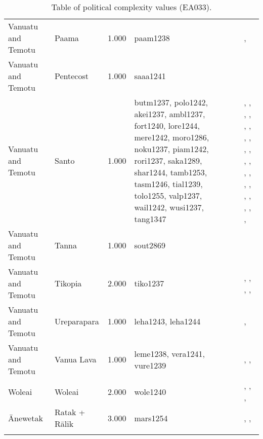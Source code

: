 \begin{longtable}{p{1.8cm}p{1.8cm}p{1.8cm}p{2cm}p{7cm}}
  Vanuatu and Temotu & Paama & 1.000 & paam1238 & \citet{bonnemaison1996power}, \citet{bonnemaison1996power} \\ 
  Vanuatu and Temotu & Pentecost & 1.000 & saaa1241 & \citet{lane1956} \\ 
  Vanuatu and Temotu & Santo & 1.000 & butm1237, polo1242, akei1237, ambl1237, fort1240, lore1244, mere1242, moro1286, noku1237, piam1242, rori1237, saka1289, shar1244, tamb1253, tasm1246, tial1239, tolo1255, valp1237, wail1242, wusi1237, tang1347 & \citet{bonnemaison1996power}, \citet{bonnemaison1996power}, \citet{bonnemaison1996power}, \citet{bonnemaison1996power}, \citet{bonnemaison1996power}, \citet{bonnemaison1996power}, \citet{bonnemaison1996power}, \citet{bonnemaison1996power}, \citet{bonnemaison1996power}, \citet{bonnemaison1996power}, \citet{bonnemaison1996power}, \citet{bonnemaison1996power}, \citet{bonnemaison1996power}, \citet{bonnemaison1996power}, \citet{bonnemaison1996power}, \citet{bonnemaison1996power}, \citet{bonnemaison1996power}, \citet{bonnemaison1996power}, \citet{bonnemaison1996power}, \citet{bonnemaison1996power}, \citet{bonnemaison1996power}, \citet{bonnemaison1996power} \\ 
  Vanuatu and Temotu & Tanna & 1.000 & sout2869 & \citet{lindstroem1991} \\ 
  Vanuatu and Temotu & Tikopia & 2.000 & tiko1237 & \citet{kirch1994wet}, \citet{sahlins1958social}, \citet{firth1939primitive}, \citet{firth1959social}, \citet{firth1991} \\ 
  Vanuatu and Temotu & Ureparapara & 1.000 & leha1243, leha1244 & \citet{bonnemaison1996power}, \citet{bonnemaison1996power} \\ 
  Vanuatu and Temotu & Vanua Lava & 1.000 & leme1238, vera1241, vure1239 & \citet{bonnemaison1996power}, \citet{bonnemaison1996power}, \citet{bonnemaison1996power} \\ 
  Woleai & Woleai & 2.000 & wole1240 & \citet{alkire1991woleai}, \citet{alkire1991woleai}, \citet{burrowsandspiro1953}, \citet{burrowsandspiro1953} \\ 
  Ānewetak & Ratak + Rālik & 3.000 & mars1254 & \citet{carruci1991marshall}, \citet{erdland1914}, \citet{williamson_1982} \\ 
   \bottomrule
\caption{Table of political complexity values (EA033).} 
\label{appendix_pol_complex_xtable}
\end{longtable}
